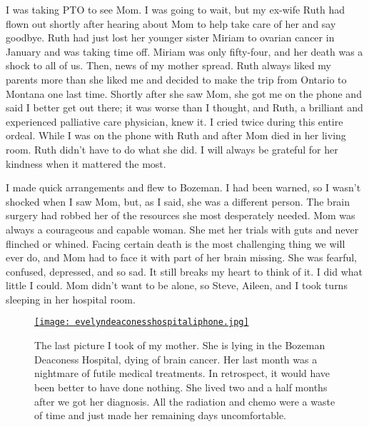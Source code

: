 I was taking PTO to see Mom. I was going to wait, but my ex-wife Ruth
had flown out shortly after hearing about Mom to help take care of her
and say goodbye. Ruth had just lost her younger sister Miriam to ovarian
cancer in January and was taking time off. Miriam was only fifty-four,
and her death was a shock to all of us. Then, news of my mother spread.
Ruth always liked my parents more than she liked me and decided to make
the trip from Ontario to Montana one last time. Shortly after she saw
Mom, she got me on the phone and said I better get out there; it was
worse than I thought, and Ruth, a brilliant and experienced palliative
care physician, knew it. I cried twice during this entire ordeal. While
I was on the phone with Ruth and after Mom died in her living room. Ruth
didn't have to do what she did. I will always be grateful for her
kindness when it mattered the most.

I made quick arrangements and flew to Bozeman. I had been warned, so I
wasn't shocked when I saw Mom, but, as I said, she was a different
person. The brain surgery had robbed her of the resources she most
desperately needed. Mom was always a courageous and capable woman. She
met her trials with guts and never flinched or whined. Facing certain
death is the most challenging thing we will ever do, and Mom had to face
it with part of her brain missing. She was fearful, confused, depressed,
and so sad. It still breaks my heart to think of it. I did what little I
could. Mom didn't want to be alone, so Steve, Aileen, and I took turns
sleeping in her hospital room.


\captionsetup[figure]{labelformat=empty}
\begin{SCfigure}[50]
\centering
\href{https://conceptcontrol.smugmug.com/Themes/Diaries/Cell-Phoning-It-In/i-pt7MmV3/A}{\texttt{[image: evelyndeaconesshospitaliphone.jpg]}}
\caption[The last picture I took of my mother]{The last picture I took of my mother. She is lying in the
Bozeman Deaconess Hospital, dying of brain cancer. Her last month was a
nightmare of futile medical treatments. In retrospect, it would have been
better to have done nothing. She lived two and a half months after we got
her diagnosis. All the radiation and chemo were a waste of time and just
made her remaining days uncomfortable.}
\label{fig:8149x0}
\end{SCfigure}

